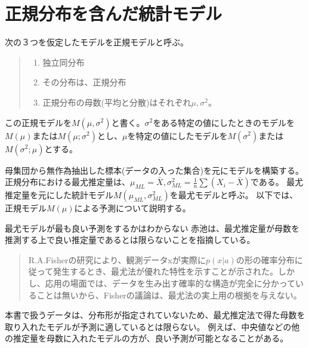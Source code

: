 \section{正規分布を含んだ統計モデル}
次の３つを仮定したモデルを正規モデルと呼ぶ。
\begin{quote}
    \begin{enumerate}[(1)]
    \item 独立同分布
    \item その分布は、正規分布
    \item 正規分布の母数(平均と分散)はそれぞれ$\mu,\sigma^2$。
    \end{enumerate}
\end{quote}
この正規モデルを$M(\mu,\sigma^2)$と書く。$\sigma^2$をある特定の値にしたときのモデルを$M(\mu)$または$M(\mu;\sigma^2)$とし、$\mu$を特定の値にしたモデルを$M(\sigma^2)$または$M(\sigma^2;\mu)$とする。

母集団から無作為抽出した標本(データの入った集合)を元にモデルを構築する。正規分布における最尤推定量は、$\mu_{ML}=\bar{X},\sigma^2_{ML}=\frac{1}{n}\sum(X_i-\bar{X})$である。
最尤推定量を元にした統計モデル$M(\mu_{ML},\sigma^2_{ML})$を最尤モデルと呼ぶ。
以下では、正規モデル$M(\mu)$による予測について説明する。

\begin{SMbox}{最尤モデルが最も良い予測をするかはわからない}
赤池は、最尤推定量が母数を推測する上で良い推定量であるとは限らないことを指摘している\cite{1570854174583769344}。
 \begin{quote}
  R.A.Fisherの研究により、観測データxが実際に$p(x|a)$の形の確率分布に従って発生するとき、最尤法が優れた特性を示すことが示された。しかし、応用の場面では、データを生み出す確率的な構造が完全に分かっていることは無いから、Fisherの議論は、最尤法の実上用の根拠を与えない。
 \end{quote}

 本書で扱うデータは、分布形が指定されていないため、最尤推定法で得た母数を取り入れたモデルが予測に適しているとは限らない。
 例えば、中央値などの他の推定量を母数に入れたモデルの方が、良い予測が可能となることがある。

\end{SMbox}



